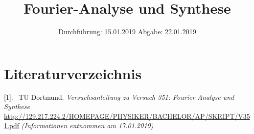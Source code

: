

\subject{Nr. 351}
\title{Fourier-Analyse und Synthese}
\date{%
  Durchführung: 15.01.2019
  \hspace{3em}
  Abgabe: 22.01.2019
}



\maketitle
\thispagestyle{empty}
\tableofcontents
\newpage






\printbibliography{}

\section{Literaturverzeichnis}

[1]: \ TU Dortmund. \textit{Versuchsanleitung zu Versuch 351: Fourier-Analyse und Synthese}\newline
\url{http://129.217.224.2/HOMEPAGE/PHYSIKER/BACHELOR/AP/SKRIPT/V351.pdf}
\textit{(Informationen entnommen am 17.01.2019)}\newline



